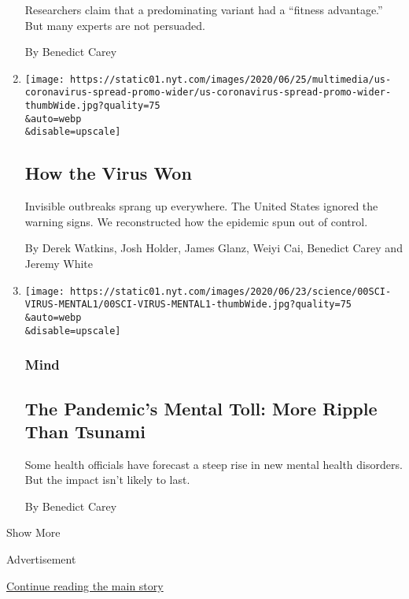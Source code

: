 \begin{enumerate}
  Researchers claim that a predominating variant had a ``fitness
  advantage.'' But many experts are not persuaded.

  By Benedict Carey
\item
  \href{/interactive/2020/us/coronavirus-spread.html}{}

  \texttt{[image: https://static01.nyt.com/images/2020/06/25/multimedia/us-coronavirus-spread-promo-wider/us-coronavirus-spread-promo-wider-thumbWide.jpg?quality=75\\\&auto=webp\\\&disable=upscale]}

  \hypertarget{how-the-virus-won}{%
  \subsection{How the Virus Won}\label{how-the-virus-won}}

  Invisible outbreaks sprang up everywhere. The United States ignored
  the warning signs. We reconstructed how the epidemic spun out of
  control.

  By Derek Watkins, Josh Holder, James Glanz, Weiyi Cai, Benedict Carey
  and Jeremy White
\item
  \href{/2020/06/21/health/coronavirus-mental-health-anxiety.html}{}

  \texttt{[image: https://static01.nyt.com/images/2020/06/23/science/00SCI-VIRUS-MENTAL1/00SCI-VIRUS-MENTAL1-thumbWide.jpg?quality=75\\\&auto=webp\\\&disable=upscale]}

  \hypertarget{mind}{%
  \subsubsection{Mind}\label{mind}}

  \hypertarget{the-pandemics-mental-toll-more-ripple-than-tsunami}{%
  \subsection{The Pandemic's Mental Toll: More Ripple Than
  Tsunami}\label{the-pandemics-mental-toll-more-ripple-than-tsunami}}

  Some health officials have forecast a steep rise in new mental health
  disorders. But the impact isn't likely to last.

  By Benedict Carey
\end{enumerate}

Show More

Advertisement

\protect\hyperlink{after-mid2}{Continue reading the main story}

